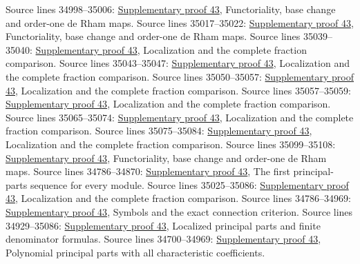 \begin{AlgebraSourceRoutes}
 Source lines 34998--35006: \hyperlink{algebra_diff_operators_notes_20260928}{Supplementary proof 43}, Functoriality, base change and order-one de Rham maps.
 Source lines 35017--35022: \hyperlink{algebra_diff_operators_notes_20260928}{Supplementary proof 43}, Functoriality, base change and order-one de Rham maps.
 Source lines 35039--35040: \hyperlink{algebra_diff_operators_notes_20260928}{Supplementary proof 43}, Localization and the complete fraction comparison.
 Source lines 35043--35047: \hyperlink{algebra_diff_operators_notes_20260928}{Supplementary proof 43}, Localization and the complete fraction comparison.
 Source lines 35050--35057: \hyperlink{algebra_diff_operators_notes_20260928}{Supplementary proof 43}, Localization and the complete fraction comparison.
 Source lines 35057--35059: \hyperlink{algebra_diff_operators_notes_20260928}{Supplementary proof 43}, Localization and the complete fraction comparison.
 Source lines 35065--35074: \hyperlink{algebra_diff_operators_notes_20260928}{Supplementary proof 43}, Localization and the complete fraction comparison.
 Source lines 35075--35084: \hyperlink{algebra_diff_operators_notes_20260928}{Supplementary proof 43}, Localization and the complete fraction comparison.
 Source lines 35099--35108: \hyperlink{algebra_diff_operators_notes_20260928}{Supplementary proof 43}, Functoriality, base change and order-one de Rham maps.
 Source lines 34786--34870: \hyperlink{algebra_diff_operators_notes_20260928}{Supplementary proof 43}, The first principal-parts sequence for every module.
 Source lines 35025--35086: \hyperlink{algebra_diff_operators_notes_20260928}{Supplementary proof 43}, Localization and the complete fraction comparison.
 Source lines 34786--34969: \hyperlink{algebra_diff_operators_notes_20260928}{Supplementary proof 43}, Symbols and the exact connection criterion.
 Source lines 34929--35086: \hyperlink{algebra_diff_operators_notes_20260928}{Supplementary proof 43}, Localized principal parts and finite denominator formulas.
 Source lines 34700--34969: \hyperlink{algebra_diff_operators_notes_20260928}{Supplementary proof 43}, Polynomial principal parts with all characteristic coefficients.
\end{AlgebraSourceRoutes}

